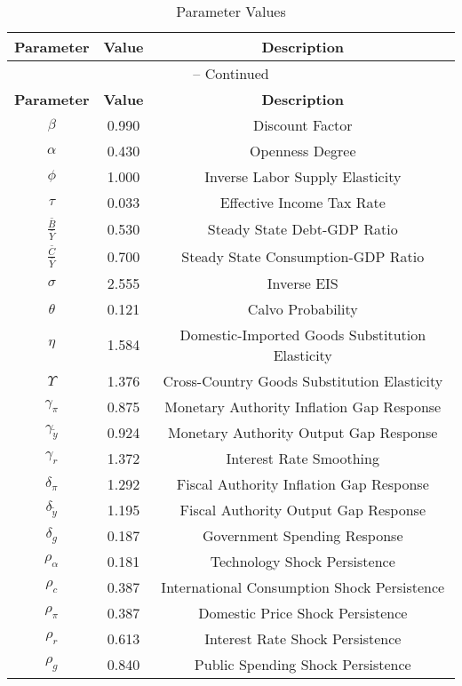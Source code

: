 \begin{center}
\begin{longtable}{ccc}
\caption{Parameter Values}\\%
\toprule%
\multicolumn{1}{c}{\textbf{Parameter}} &
\multicolumn{1}{c}{\textbf{Value}} &
 \multicolumn{1}{c}{\textbf{Description}}\\%
\midrule%
\endfirsthead
\multicolumn{3}{c}{{\tablename} \thetable{} -- Continued}\\%
\midrule%
\multicolumn{1}{c}{\textbf{Parameter}} &
\multicolumn{1}{c}{\textbf{Value}} &
  \multicolumn{1}{c}{\textbf{Description}}\\%
\midrule%
\endhead
$\beta$ 	 & 	 0.990 	 & 	 Discount Factor\\
$\alpha$ 	 & 	 0.430 	 & 	 Openness Degree\\
$\phi$ 	 & 	 1.000 	 & 	 Inverse Labor Supply Elasticity\\
$\tau$ 	 & 	 0.033 	 & 	 Effective Income Tax Rate\\
$\frac{\bar{B}}{\bar{Y}}$ 	 & 	 0.530 	 & 	 Steady State Debt-GDP Ratio\\
$\frac{\bar{C}}{\bar{Y}}$ 	 & 	 0.700 	 & 	 Steady State Consumption-GDP Ratio\\
$\sigma$ 	 & 	 2.555 	 & 	 Inverse EIS\\
$\theta$ 	 & 	 0.121 	 & 	 Calvo Probability\\
$\eta$ 	 & 	 1.584 	 & 	 Domestic-Imported Goods Substitution Elasticity\\
$\Upsilon$ 	 & 	 1.376 	 & 	 Cross-Country Goods Substitution Elasticity\\
$\gamma_{\pi}$ 	 & 	 0.875 	 & 	 Monetary Authority Inflation Gap Response\\
$\gamma_{\tilde{y}}$ 	 & 	 0.924 	 & 	 Monetary Authority Output Gap Response\\
$\gamma_{r}$ 	 & 	 1.372 	 & 	 Interest Rate Smoothing\\
$\delta_{\pi}$ 	 & 	 1.292 	 & 	 Fiscal Authority Inflation Gap Response\\
$\delta_{\tilde{y}}$ 	 & 	 1.195 	 & 	 Fiscal Authority Output Gap Response\\
$\delta_{g}$ 	 & 	 0.187 	 & 	 Government Spending Response\\
$\rho_{\alpha}$ 	 & 	 0.181 	 & 	 Technology Shock Persistence\\
$\rho_{c}$ 	 & 	 0.387 	 & 	 International Consumption Shock Persistence\\
$\rho_{\pi}$ 	 & 	 0.387 	 & 	 Domestic Price Shock Persistence\\
$\rho_{r}$ 	 & 	 0.613 	 & 	 Interest Rate Shock Persistence\\
$\rho_{g}$ 	 & 	 0.840 	 & 	 Public Spending Shock Persistence\\
\bottomrule%
\end{longtable}
\end{center}
